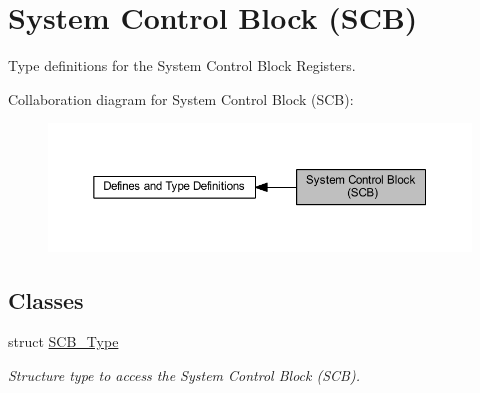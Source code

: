 \hypertarget{group___c_m_s_i_s___s_c_b}{}\section{System Control Block (S\+CB)}
\label{group___c_m_s_i_s___s_c_b}


Type definitions for the System Control Block Registers.  


Collaboration diagram for System Control Block (S\+CB)\+:
\nopagebreak
\begin{figure}[H]
\begin{center}
\leavevmode
\includegraphics[width=350pt]{group___c_m_s_i_s___s_c_b}
\end{center}
\end{figure}
\subsection*{Classes}
\begin{DoxyCompactItemize}
\item 
struct \hyperlink{struct_s_c_b___type}{S\+C\+B\+\_\+\+Type}
\begin{DoxyCompactList}\small\item\em Structure type to access the System Control Block (S\+CB). \end{DoxyCompactList}\end{DoxyCompactItemize}
